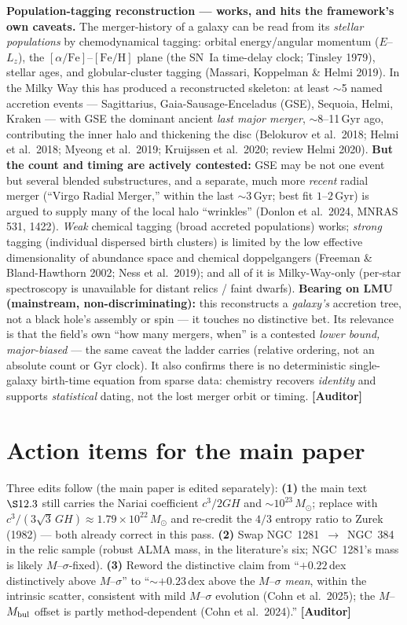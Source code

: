\documentclass[11pt]{article}
\newcommand{\Auditor}{\textbf{\textcolor{teal!55!black}{[Auditor]}}}
\newcommand{\msun}{M_\odot}
\begin{document}
\medskip\noindent\textbf{Population-tagging reconstruction --- works, and hits the framework's own caveats.} The merger-history of a galaxy can be read from its \emph{stellar populations} by chemodynamical tagging: orbital energy/angular momentum ($E$--$L_z$), the $[\alpha/\mathrm{Fe}]$--$[\mathrm{Fe/H}]$ plane (the SN~Ia time-delay clock; Tinsley 1979), stellar ages, and globular-cluster tagging (Massari, Koppelman \& Helmi 2019). In the Milky Way this has produced a reconstructed skeleton: at least $\sim$5 named accretion events --- Sagittarius, Gaia-Sausage-Enceladus (GSE), Sequoia, Helmi, Kraken --- with GSE the dominant ancient \emph{last major merger}, $\sim$8--11\,Gyr ago, contributing the inner halo and thickening the disc (Belokurov et al.\ 2018; Helmi et al.\ 2018; Myeong et al.\ 2019; Kruijssen et al.\ 2020; review Helmi 2020). \textbf{But the count and timing are actively contested:} GSE may be not one event but several blended substructures, and a separate, much more \emph{recent} radial merger (``Virgo Radial Merger,'' within the last $\sim$3\,Gyr; best fit $1$--$2$\,Gyr) is argued to supply many of the local halo ``wrinkles'' (Donlon et al.\ 2024, MNRAS 531, 1422). \emph{Weak} chemical tagging (broad accreted populations) works; \emph{strong} tagging (individual dispersed birth clusters) is limited by the low effective dimensionality of abundance space and chemical doppelgangers (Freeman \& Bland-Hawthorn 2002; Ness et al.\ 2019); and all of it is Milky-Way-only (per-star spectroscopy is unavailable for distant relics / faint dwarfs). \textbf{Bearing on LMU (mainstream, non-discriminating):} this reconstructs a \emph{galaxy's} accretion tree, not a black hole's assembly or spin --- it touches no distinctive bet. Its relevance is that the field's own ``how many mergers, when'' is a contested \emph{lower bound, major-biased} --- the same caveat the ladder carries (relative ordering, not an absolute count or Gyr clock). It also confirms there is no deterministic single-galaxy birth-time equation from sparse data: chemistry recovers \emph{identity} and supports \emph{statistical} dating, not the lost merger orbit or timing. \Auditor



\section{Action items for the main paper}
Three edits follow (the main paper is edited separately): \textbf{(1)} the main text $\S12.3$ still carries the Nariai coefficient $c^3/2GH$ and $\sim10^{23}\,\msun$; replace with $c^3/(3\sqrt3\,GH)\approx1.79\times10^{22}\,\msun$ and re-credit the $4/3$ entropy ratio to Zurek (1982) --- both already correct in this pass. \textbf{(2)} Swap NGC~1281~$\to$~NGC~384 in the relic sample (robust ALMA mass, in the literature's six; NGC~1281's mass is likely $M$--$\sigma$-fixed). \textbf{(3)} Reword the distinctive claim from ``$+0.22$\,dex distinctively above $M$--$\sigma$'' to ``$\sim+0.23$\,dex above the $M$--$\sigma$ \emph{mean}, within the intrinsic scatter, consistent with mild $M$--$\sigma$ evolution (Cohn et al.\ 2025); the $M$--$M_{\rm bul}$ offset is partly method-dependent (Cohn et al.\ 2024).'' \Auditor
\end{document}

